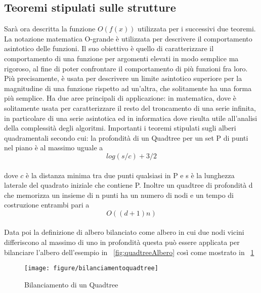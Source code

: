 \subsection{Teoremi stipulati sulle strutture}
Sar\`a ora descritta la funzione $O (f(x))$ utilizzata per i successivi due teoremi.
La notazione matematica O-grande \`e utilizzata per descrivere il comportamento asintotico delle funzioni. Il suo obiettivo \`e quello di caratterizzare il comportamento di una funzione per argomenti elevati in modo semplice ma rigoroso, al fine di poter confrontare il comportamento di pi\`u funzioni fra loro. Pi\`u precisamente, \`e usata per descrivere un limite asintotico superiore per la magnitudine di una funzione rispetto ad un'altra, che solitamente ha una forma pi\`u semplice. Ha due aree principali di applicazione: in matematica, dove \`e solitamente usata per caratterizzare il resto del troncamento di una serie infinita, in particolare di una serie asintotica ed in informatica dove risulta utile all'analisi della complessit\`a degli algoritmi. 
Importanti i teoremi stipulati sugli alberi quadramentali secondo cui: la profondit\`a di un Quadtree per un set P di punti nel piano \`e al massimo uguale a\\
$$log (s / c) + 3/2$$\\
dove $c$ \`e la distanza minima tra due punti qualsiasi in P e s \`e la lunghezza laterale del quadrato iniziale che contiene P.
Inoltre un quadtree di profondit\`a d che memorizza un insieme di n punti ha un numero di nodi e un tempo di costruzione entrambi pari a\\
$$ O ((d + 1) n)$$\\

Data poi la definizione di albero bilanciato come albero in cui due nodi vicini differiscono al massimo di uno in profondit\`a questa pu\`o essere applicata per bilanciare l'albero dell'esempio in \figurename~\ref{fig:quadtreeAlbero} cos\`i come mostrato in \figurename~\ref{fig:quadtreebilanciamento}\\
\begin{figure}[!htb]
	\begin{center}
		\texttt{[image: figure/bilanciamentoquadtree]}
	\end{center}
	\caption{Bilanciamento di un Quadtree \label{fig:quadtreebilanciamento}}
\end{figure}\hfill

